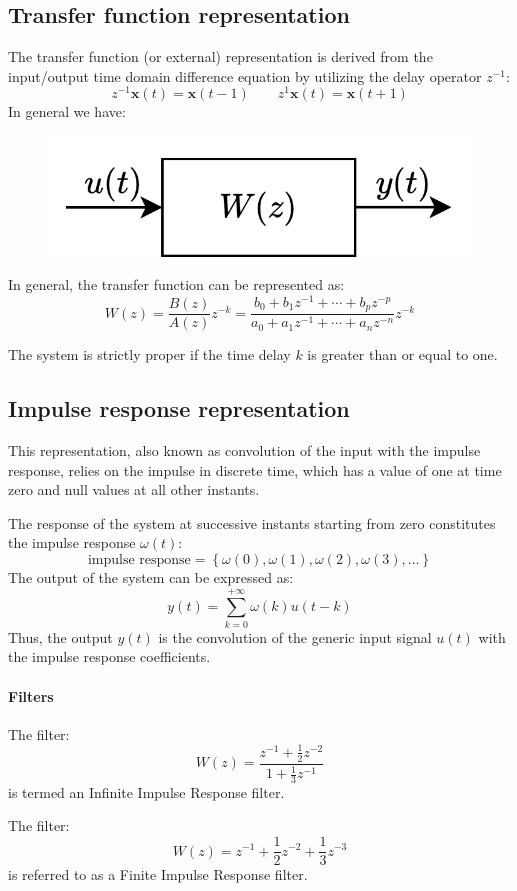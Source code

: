 \subsection{Transfer function representation}
The transfer function (or external) representation is derived from the input/output time domain difference equation by utilizing the delay operator $z^{-1}$: 
\[z^{-1} \mathbf{x}(t)= \mathbf{x}(t-1) \qquad z^{1}\mathbf{x}(t)=\mathbf{x}(t+1)\]
\noindent In general we have: 
\begin{figure}[H]
    \centering
    \includegraphics[width=0.4\linewidth]{images/transfer.png}
\end{figure}
\noindent In general, the transfer function can be represented as:
\[W(z)=\dfrac{B(z)}{A(z)}z^{-k}=\dfrac{b_0+b_1 z^{-1}+\cdots+b_p z^{-p}}{a_0+a_1 z^{-1}+\cdots+a_n z^{-n}}z^{-k}\]
\begin{property}
    The system is strictly proper if the time delay $k$ is greater than or equal to one.
\end{property}    

\subsection{Impulse response representation}
This representation, also known as convolution of the input with the impulse response, relies on the impulse in discrete time, which has a value of one at time zero and null values at all other instants.

The response of the system at successive instants starting from zero constitutes the impulse response $\omega(t)$: 
\[\text{impulse response}=\left\{ \omega(0),\omega(1),\omega(2),\omega(3),\dots \right\}\]
The output of the system can be expressed as:
\[y(t)=\sum_{k=0}^{+\infty}\omega(k)u(t-k)\]
Thus, the output $y(t)$ is the convolution of the generic input signal $u(t)$ with the impulse response coefficients.

\paragraph*{Filters}
The filter: 
\[W(z)=\dfrac{z^{-1}+\frac{1}{2}z^{-2}}{1+\frac{1}{3}z^{-1}}\]
is termed an Infinite Impulse Response filter.

The filter: 
\[W(z)=z^{-1}+\dfrac{1}{2}z^{-2}+\dfrac{1}{3}z^{-3}\]
is referred to as a Finite Impulse Response filter.